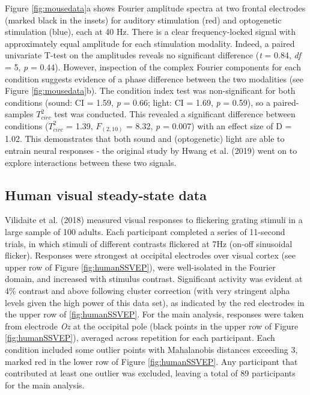 \documentclass[]{article}
\begin{document}
Figure \ref{fig:mousedata}a shows Fourier amplitude spectra at two frontal electrodes (marked black in the insets) for auditory stimulation (red) and optogenetic stimulation (blue), each at 40 Hz. There is a clear frequency-locked signal with approximately equal amplitude for each stimulation modality. Indeed, a paired univariate T-test on the amplitudes reveals no significant difference (\emph{t} = 0.84, \emph{df} = 5, \emph{p} = 0.44). However, inspection of the complex Fourier components for each condition suggests evidence of a phase difference between the two modalities (see Figure \ref{fig:mousedata}b). The condition index test was non-significant for both conditions (sound: CI = 1.59, \emph{p} = 0.66; light: CI = 1.69, \emph{p} = 0.59), so a paired-samples \(T^2_{circ}\) test was conducted. This revealed a significant difference between conditions (\(T^2_{circ}\) = 1.39, \(F_{(2,10)}\) = 8.32, \emph{p} = 0.007) with an effect size of D = 1.02. This demonstrates that both sound and (optogenetic) light are able to entrain neural responses - the original study by Hwang et al. (2019) went on to explore interactions between these two signals.

\hypertarget{human-visual-steady-state-data}{%
\subsection{Human visual steady-state data}\label{human-visual-steady-state-data}}

Vilidaite et al. (2018) measured visual responses to flickering grating stimuli in a large sample of 100 adults. Each participant completed a series of 11-second trials, in which stimuli of different contrasts flickered at 7Hz (on-off sinusoidal flicker). Responses were strongest at occipital electrodes over visual cortex (see upper row of Figure \ref{fig:humanSSVEP}), were well-isolated in the Fourier domain, and increased with stimulus contrast. Significant activity was evident at 4\% contrast and above following cluster correction (with very stringent alpha levels given the high power of this data set), as indicated by the red electrodes in the upper row of \ref{fig:humanSSVEP}. For the main analysis, responses were taken from electrode \emph{Oz} at the occipital pole (black points in the upper row of Figure \ref{fig:humanSSVEP}), averaged across repetition for each participant. Each condition included some outlier points with Mahalanobis distances exceeding 3, marked red in the lower row of Figure \ref{fig:humanSSVEP}. Any participant that contributed at least one outlier was excluded, leaving a total of 89 participants for the main analysis.
\end{document}
